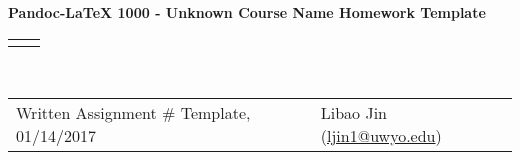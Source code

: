 \documentclass[11pt]{article}
\renewcommand{\title}[1]{\textbf{#1}\\}
\renewcommand{\line}{\begin{tabularx}{\textwidth}{X>{\raggedleft}X}\hline\\\end{tabularx}\\[-0.5cm]}
\newcommand{\leftright}[2]{\begin{tabularx}{\textwidth}{X>{\raggedleft}X}#1%
& #2\\\end{tabularx}\\[-0.5cm]}
\renewcommand{\theequation}{\thesection.\arabic{equation}}
\numberwithin{equation}{section}
\begin{document}
\title{Pandoc-LaTeX 1000 - Unknown Course Name Homework Template}
\line
\leftright{Written Assignment \# Template, 01/14/2017}{Libao Jin (\url{ljin1@uwyo.edu})}

\vspace*{-2cm}
\renewcommand{\theequation}{1.\arabic{equation}}
\setcounter{equation}{0}

\end{document}
